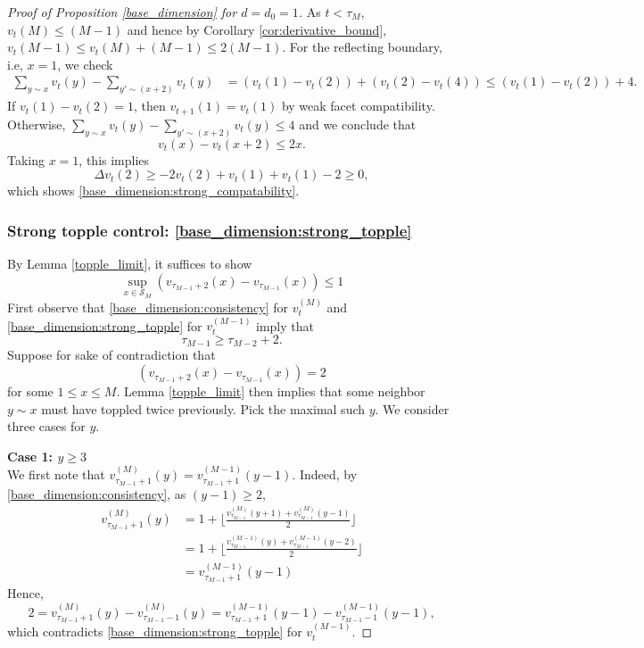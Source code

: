\documentclass[12pt]{amsart}
\begin{document}
\begin{proof}[Proof of Proposition \ref{base_dimension} for $d=d_0 = 1$]
		As $t < \tau_M$, $v_t(M) \leq (M-1)$ and hence by Corollary \ref{cor:derivative_bound}, 
		$v_t(M-1) \leq v_{t}(M) + (M-1) \leq 2 (M-1)$. For the reflecting boundary, i.e, $x=1$, we check  
		\begin{align*}
		\sum_{y \sim x} v_t(y) - \sum_{y' \sim (x+2)} v_t(y) &= (v_t(1) - v_t(2)) + (v_t(2) - v_t(4))  \leq (v_t(1) - v_t(2)) + 4.
		\end{align*}
		If $v_t(1) - v_t(2) = 1$, then $v_{t+1}(1) = v_{t}(1)$ by weak facet compatibility. 
		Otherwise, $\sum_{y \sim x} v_t(y) - \sum_{y' \sim (x+2)} v_t(y) \leq 4$ and we conclude that 
		\[
		v_t(x) - v_t(x + 2) \leq 2 x. 
		\]
		Taking $x=1$, this implies 
		\[
		\Delta v_t(2) \geq -2 v_t(2) + v_t(1) + v_t(1) -2
		\geq 0, 
		\]
		which shows \eqref{base_dimension:strong_compatability}. 
		
		\subsubsection*{Strong topple control: \eqref{base_dimension:strong_topple}}
		By Lemma \ref{topple_limit}, it suffices to show 
		\[ 
		\sup_{x \in \mathcal{S}_M} \left(v_{\tau_{M-1}+2}(x) - v_{\tau_{M-1}}(x)\right) \leq 1
		\]
		First observe that \eqref{base_dimension:consistency} for $v_t^{(M)}$ and \eqref{base_dimension:strong_topple} for $v_t^{(M-1)}$ imply that
		\begin{equation} \label{eq:topple_time_lower_bound}
		\tau_{M-1} \geq \tau_{M-2} + 2. 
		\end{equation}
		Suppose for sake of contradiction that 
		\[
		\left(v_{\tau_{M-1}+2}(x) - v_{\tau_{M-1}}(x)\right) = 2
		\]
		for some $1 \leq x \leq M$. Lemma \ref{topple_limit} then implies
		that some neighbor $y \sim x$ must have toppled twice previously. Pick 
		the maximal such $y$.  We consider three cases for $y$. 
		
		{\bf Case 1: $y \geq 3$} \\
		We first note that $v_{\tau_{M-1}+1}^{(M)}(y) = v_{\tau_{M-1}+1}^{(M-1)}(y-1)$.
		Indeed, by \eqref{base_dimension:consistency}, as $(y-1) \geq 2$, 
		\begin{align*}
		v_{\tau_{M-1}+1}^{(M)}(y) &= 1 + \lfloor \frac{v_{\tau_{M-1}}^{(M)}(y+1) + v_{\tau_{M-1}}^{(M)}(y-1)}{2} \rfloor  \\
		&= 1 + \lfloor \frac{v_{\tau_{M-1}}^{(M-1)}(y) + v_{\tau_{M-1}}^{(M-1)}(y-2)}{2} \rfloor  \\
		&= 	v_{\tau_{M-1}+1}^{(M-1)}(y-1)
		\end{align*}
		Hence, 	
		\[
		2 = v_{\tau_{M-1}+1}^{(M)}(y)-v_{\tau_{M-1}-1}^{(M)}(y) = v_{\tau_{M-1}+1}^{(M-1)}(y-1)-v_{\tau_{M-1}-1}^{(M-1)}(y-1),
		\]
		which contradicts \eqref{base_dimension:strong_topple} for $v_t^{(M-1)}$.
		

\end{proof}
\end{document}
